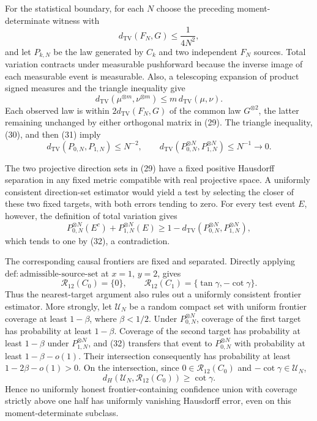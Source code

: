For the statistical boundary, for each \(N\) choose the preceding moment-determinate witness with
\[
 d_{\mathrm{TV}}(F_N,G)\le\frac{1}{4N^2}, \tag{30}
\]
and let \(P_{k,N}\) be the law generated by \(C_k\) and two independent \(F_N\) sources. Total variation contracts under measurable pushforward because the inverse image of each measurable event is measurable. Also, a telescoping expansion of product signed measures and the triangle inequality give
\[
 d_{\mathrm{TV}}(\mu^{\otimes m},\nu^{\otimes m})
 \le m\,d_{\mathrm{TV}}(\mu,\nu). \tag{31}
\]
Each observed law is within \(2d_{\mathrm{TV}}(F_N,G)\) of the common law \(G^{\otimes2}\), the latter remaining unchanged by either orthogonal matrix in (29). The triangle inequality, (30), and then (31) imply
\[
 d_{\mathrm{TV}}(P_{0,N},P_{1,N})\le N^{-2},
 \qquad
 d_{\mathrm{TV}}(P_{0,N}^{\otimes N},P_{1,N}^{\otimes N})\le N^{-1}\longrightarrow0. \tag{32}
\]

The two projective direction sets in (29) have a fixed positive Hausdorff separation in any fixed metric compatible with real projective space. A uniformly consistent direction-set estimator would yield a test by selecting the closer of these two fixed targets, with both errors tending to zero. For every test event \(E\), however, the definition of total variation gives
\[
 P_{0,N}^{\otimes N}(E^c)+P_{1,N}^{\otimes N}(E)
 \ge1-d_{\mathrm{TV}}(P_{0,N}^{\otimes N},P_{1,N}^{\otimes N}), \tag{33}
\]
which tends to one by (32), a contradiction.

The corresponding causal frontiers are fixed and separated. Directly applying \(\mathrm{def{:}admissible\text{-}source\text{-}set}\) at \(x=1\), \(y=2\), gives
\[
 \mathcal R_{12}(C_0)=\{0\},
 \qquad
 \mathcal R_{12}(C_1)=\{\tan\gamma,-\cot\gamma\}. \tag{34}
\]
Thus the nearest-target argument also rules out a uniformly consistent frontier estimator. More strongly, let \(\mathcal U_N\) be a random compact set with uniform frontier coverage at least \(1-\beta\), where \(\beta<1/2\). Under \(P_{0,N}^{\otimes N}\), coverage of the first target has probability at least \(1-\beta\). Coverage of the second target has probability at least \(1-\beta\) under \(P_{1,N}^{\otimes N}\), and (32) transfers that event to \(P_{0,N}^{\otimes N}\) with probability at least \(1-\beta-o(1)\). Their intersection consequently has probability at least \(1-2\beta-o(1)>0\). On the intersection, since \(0\in\mathcal R_{12}(C_0)\) and \(-\cot\gamma\in\mathcal U_N\),
\[
 d_H(\mathcal U_N,\mathcal R_{12}(C_0))\ge\cot\gamma. \tag{35}
\]
Hence no uniformly honest frontier-containing confidence union with coverage strictly above one half has uniformly vanishing Hausdorff error, even on this moment-determinate subclass.

